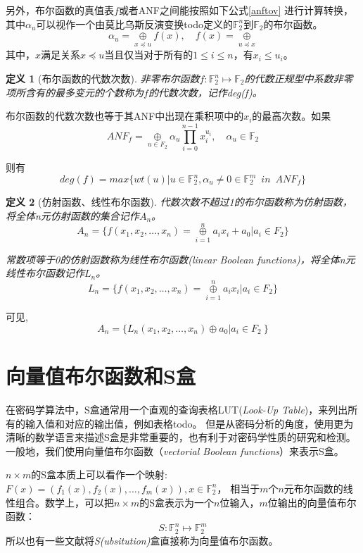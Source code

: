 \documentclass{xduugthesis}
\numberwithin{equation}{section}
\newtheorem{definition}{定义}
\begin{document}
另外，布尔函数的真值表$f$或者ANF之间能按照如下公式\eqref{anftov} 进行计算转换，其中$\alpha_u$可以视作一个由莫比乌斯反演变换todo定义的$\mathbb{F}_2^n$到$\mathbb{F}_2$的布尔函数。
\begin{equation}
\alpha_u =\mathop{\oplus}\limits_{x\preceq u}f(x), \quad f(x)=\mathop{\oplus}\limits_{u\preceq x} \label{anftov}
\end{equation}
其中，$x$满足关系$x\preceq u$当且仅当对于所有的$1 \le i \le n$，有$x_i \le u_i$。\par

\begin{definition}[布尔函数的代数次数]
    非零布尔函数$f:\mathbb{F}_2^n \mapsto \mathbb{F}_2$的代数正规型中系数非零项所含有的最多变元的个数称为$f$的代数次数，记作deg(f)。
\end{definition}\par
布尔函数的代数次数也等于其ANF中出现在乘积项中的$x_i$的最高次数。如果
$$
ANF_f =\mathop{\oplus}\limits_{u \in F_2}\alpha_u \prod\limits_{i=0}^{n-1} x_i^{u_i},\quad \alpha_u \in \mathbb{F}_2
$$\par
则有
\begin{equation}
    deg(f) = max\{wt(u)|u\in \mathbb{F}_2^n,\alpha_u \ne 0 \in \mathbb{F}_2^m \enspace in \enspace ANF_f \}
\end{equation}\par

\begin{definition}[仿射函数、线性布尔函数]
    代数次数不超过1的布尔函数称为仿射函数，将全体n元仿射函数的集合记作$A_n$。
$$
A_n = \{ f(x_1,x_2,\dots ,x_n) = \mathop{\oplus}\limits_{i=1}^n a_ix_i + a_0 |a_i \in F_2 \}
$$\par
常数项等于0的仿射函数称为线性布尔函数(linear Boolean functions)，将全体n元线性布尔函数记作$L_n$。
$$
L_n = \{ f(x_1,x_2,\dots ,x_n) = \mathop{\oplus}\limits_{i=1}^n a_ix_i |a_i \in F_2 \}
$$
\end{definition}\par
可见,
$$
A_n = \{ L_n(x_1,x_2,\dots ,x_n) \oplus a_0 |a_i \in F_2 \ \}
$$



\section{向量值布尔函数和S盒}

在密码学算法中，S盒通常用一个直观的查询表格LUT(\emph{Look-Up Table})，来列出所有的输入值和对应的输出值，例如表格todo。
但是从密码分析的角度，使用更为清晰的数学语言来描述S盒是非常重要的，也有利于对密码学性质的研究和检测。一般地，我们使用向量值布尔函数（\emph{vectorial Boolean functions}）来表示S盒。\par
$n\times m$的S盒本质上可以看作一个映射:$F(x) = (f_1(x), f_2(x),\dots , f_m(x)), x\in \mathbb{F}_2^n$，
相当于$m$个$n$元布尔函数的线性组合。数学上，可以把$n\times m$的S盒表示为一个$n$位输入，$m$位输出的向量值布尔函数：
$$
S:\mathbb{F}_2^n \mapsto \mathbb{F}_2^m
$$
所以也有一些文献将\emph{S(ubsitution)}盒直接称为向量值布尔函数。\par
\end{document}
